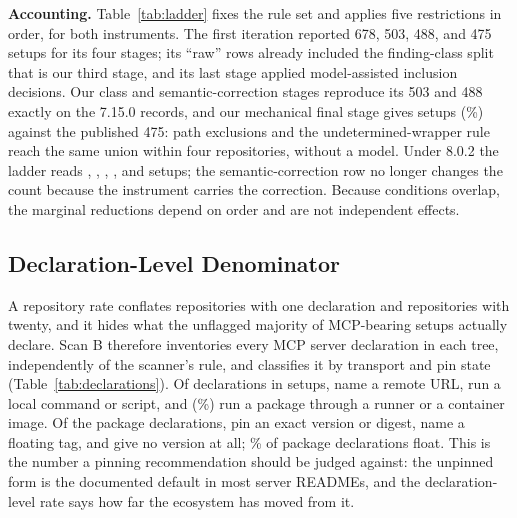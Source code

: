 \documentclass[10pt,conference]{IEEEtran}
\newcommand{\vold}{7.15.0}
\newcommand{\vnew}{8.0.2}
\newcommand{\pct}[1]{#1\%}
\begin{document}
\textbf{Accounting.} Table~\ref{tab:ladder} fixes the rule set and applies five restrictions in order, for both instruments. The first iteration reported 678, 503, 488, and 475 setups for its four stages; its ``raw'' rows already included the finding-class split that is our third stage, and its last stage applied model-assisted inclusion decisions. Our class and semantic-correction stages reproduce its 503 and 488 exactly on the \vold{} records, and our mechanical final stage gives \LadderOldFinal{} setups (\pct{\LadderOldFinalPct}) against the published 475: path exclusions and the undetermined-wrapper rule reach the same union within four repositories, without a model. Under \vnew{} the ladder reads \LadderNewRawThirtyOne{}, \LadderNewRawSix{}, \LadderNewClass{}, \LadderNewNofind{}, and \LadderNewFinal{} setups; the semantic-correction row no longer changes the count because the instrument carries the correction. Because conditions overlap, the marginal reductions depend on order and are not independent effects.

\begin{table}[t]
\centering
\caption{Fixed-rule accounting for the setup union, both instruments on the pinned commits. Each row applies the stated restriction to the row above.}
\label{tab:ladder}
\small

\end{table}

\subsection{Declaration-Level Denominator}
\label{sec:declarations}

\begin{table}[t]
\centering
\caption{Every MCP server declaration found in setups (Scan B), classified by transport and pin state independently of any rule. Package declarations are those run through a package runner or container image.}
\label{tab:declarations}
\small

\end{table}

A repository rate conflates repositories with one declaration and repositories with twenty, and it hides what the unflagged majority of MCP-bearing setups actually declare. Scan B therefore inventories every MCP server declaration in each tree, independently of the scanner's rule, and classifies it by transport and pin state (Table~\ref{tab:declarations}). Of \DeclTotal{} declarations in setups, \DeclRemote{} name a remote URL, \DeclLocal{} run a local command or script, and \DeclPackage{} (\pct{\DeclPctPackage}) run a package through a runner or a container image. Of the package declarations, \DeclPackagePinned{} pin an exact version or digest, \DeclPackageTag{} name a floating tag, and \DeclPackageUnpinned{} give no version at all; \pct{\DeclPctUnpinnedOrTag} of package declarations float. This is the number a pinning recommendation should be judged against: the unpinned form is the documented default in most server READMEs, and the declaration-level rate says how far the ecosystem has moved from it.
\end{document}
